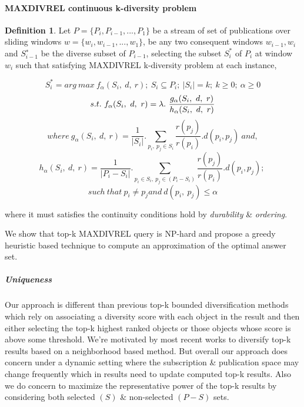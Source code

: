 \documentclass[a4paper,12pt,oneside]{book}
\theoremstyle{definition}
\newtheorem{definition}{Definition}[section]
\theoremstyle{remark}
\begin{document}
\paragraph{MAXDIVREL continuous k-diversity problem}
\label{MAXIVREL_condiv}
\begin{definition}
Let $P=\{P_i,P_{i-1},...,P_1\}$ be a stream of set of publications over sliding windows $w=\{w_i,w_{i-1},...,w_1\}$, be
any two consequent windows $w_{i-1},w_i$ and $S^∗_{i−1}$ be the diverse subset of $P_{i-1}$, selecting the subset $S^*_i$ of $P_i$ at window $w_i$  such that satisfying MAXDIVREL k-diversity problem at each instance,
\begin{center}
\[ S^*_i = arg\ max\ f_\alpha(S_i,\ d,\ r);\ S_i \subseteq P_i;\ |S_i| = k;\ k \geq 0;\ \alpha \geq 0 \]
\[s.t.\ f _\alpha(S_i,\ d,\ r) = \lambda.\ \frac{g _\alpha(S_i,\ d,\ r) \/ }{h _\alpha(S_i,\ d,\ r)} \]
\[where\ g _\alpha(S_i,\ d,\ r)=\frac{1}{|S_i|}.\sum_{p_i,\ p_j\in S_i} \frac{r(p_j)}{r(p_i)}.d(p_i,p_j)\ and,\]
\[h _\alpha(S_i,\ d,\ r)=\frac{1}{|P_i-S_i|}.\sum_{p_i\in S_i,\ p_j\in (P_i-S_i)} \frac{r(p_j)}{r(p_i)}.d(p_i,p_j);\ \]
\[such\ that \ p_{i} \neq p_{j} and\ d(p_i,\ p_j)\leq \alpha \]
\end{center}
where it must satisfies the continuity conditions hold by \emph{durability} \& \emph{ordering}.
\end{definition}

We show that top-k MAXDIVREL query is NP-hard and propose a greedy heuristic based technique to compute an approximation of the optimal answer set.

\subparagraph{Uniqueness}
Our approach is different than previous top-k bounded diversification methods which rely on associating a diversity score with each object in the result and then either selecting the top-k highest ranked objects or those objects whose score is above some threshold. We're motivated by most recent works \cite{Drosou2012, Qin2012, Ranu2014a} to diversify top-k results based on a neighborhood based method. But overall our approach does concern under a dynamic setting where the subscription \& publication space may change frequently which in results need to update computed top-k results. Also we do concern to maximize the representative power of the top-k results by considering both selected $(S)$ \& non-selected $(P-S)$ sets.


\end{document}
